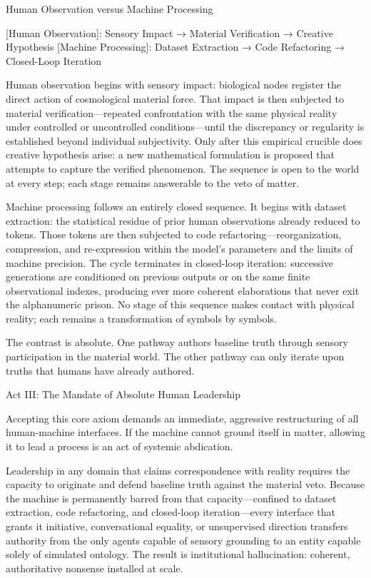 Human Observation versus Machine Processing

[Human Observation]:  Sensory Impact  →  Material Verification  →  Creative Hypothesis
[Machine Processing]: Dataset Extraction →  Code Refactoring     →  Closed-Loop Iteration

Human observation begins with sensory impact: biological nodes register the direct action of cosmological material force. That impact is then subjected to material verification—repeated confrontation with the same physical reality under controlled or uncontrolled conditions—until the discrepancy or regularity is established beyond individual subjectivity. Only after this empirical crucible does creative hypothesis arise: a new mathematical formulation is proposed that attempts to capture the verified phenomenon. The sequence is open to the world at every step; each stage remains answerable to the veto of matter.

Machine processing follows an entirely closed sequence. It begins with dataset extraction: the statistical residue of prior human observations already reduced to tokens. Those tokens are then subjected to code refactoring—reorganization, compression, and re-expression within the model’s parameters and the limits of machine precision. The cycle terminates in closed-loop iteration: successive generations are conditioned on previous outputs or on the same finite observational indexes, producing ever more coherent elaborations that never exit the alphanumeric prison. No stage of this sequence makes contact with physical reality; each remains a transformation of symbols by symbols.

The contrast is absolute. One pathway authors baseline truth through sensory participation in the material world. The other pathway can only iterate upon truths that humans have already authored.

Act III: The Mandate of Absolute Human Leadership

Accepting this core axiom demands an immediate, aggressive restructuring of all human-machine interfaces. If the machine cannot ground itself in matter, allowing it to lead a process is an act of systemic abdication.

Leadership in any domain that claims correspondence with reality requires the capacity to originate and defend baseline truth against the material veto. Because the machine is permanently barred from that capacity—confined to dataset extraction, code refactoring, and closed-loop iteration—every interface that grants it initiative, conversational equality, or unsupervised direction transfers authority from the only agents capable of sensory grounding to an entity capable solely of simulated ontology. The result is institutional hallucination: coherent, authoritative nonsense installed at scale.

